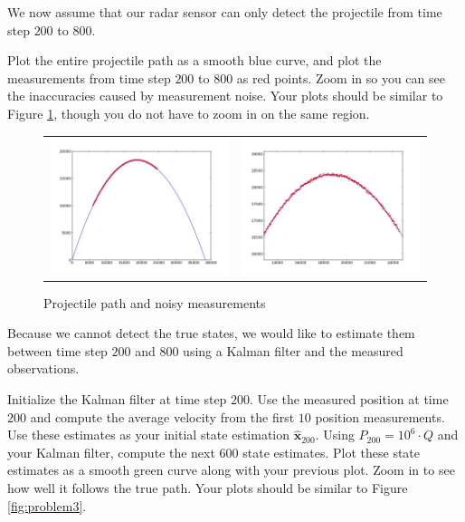 We now assume that our radar sensor can only detect the projectile from time step $200$ to $800$.

\begin{problem}
Plot the entire projectile path as a smooth blue curve, and plot the measurements from time step $200$ to $800$ as red points. Zoom in so you can see the inaccuracies caused by measurement noise. Your plots should be similar to Figure \ref{fig:problem2}, though you do not have to zoom in on the same region.
\end{problem}

\begin{figure}
	\centering
	\begin{tabular}{cc} 
	\includegraphics[width=.49\textwidth]{problem2_1.jpg} & 
	\includegraphics[width=.49\textwidth]{problem2_2.jpg}
	\end{tabular}
	\caption{Projectile path and noisy measurements}
	\label{fig:problem2}
\end{figure}

Because we cannot detect the true states, we would like to estimate them between time step $200$ and $800$ using a Kalman filter and the measured observations.

\begin{problem}
Initialize the Kalman filter at time step $200$. Use the measured position at time $200$ and compute the average velocity from the first $10$ position measurements. Use these estimates as your initial state estimation $\widehat{\mathbf{x}}_{200}$. Using $P_{200} = 10^{6} \cdot Q$ and your Kalman filter, compute the next $600$ state estimates. Plot these state estimates as a smooth green curve along with your previous plot. Zoom in to see how well it follows the true path. Your plots should be similar to Figure \ref{fig:problem3}.
\end{problem}

